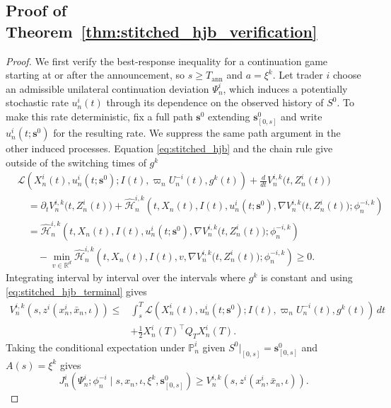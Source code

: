 \documentclass[12pt]{article}
\numberwithin{equation}{section}
\theoremstyle{definition}
\begin{document}
\subsection{Proof of Theorem~\ref{thm:stitched_hjb_verification}}
\label{subsec:proof_stitched_hjb_verification}

\begin{proof}
We first verify the best-response inequality for a continuation game starting
at or after the announcement, so \(s\geq T_{\mathrm{ann}}\) and \(a=\xi^k\).
Let trader \(i\) choose an admissible unilateral continuation deviation
\(\Psi_n^i\), which induces a potentially stochastic rate \(u_n^i(t)\) through
its dependence on the observed history of \(S^0\). To make this rate
deterministic, fix a full path \(\mathbf{s}^0\) extending \(\mathbf{s}^0_{[0,s]}\) and write
\(u_n^i(t;\mathbf{s}^0)\) for the resulting rate. We suppress the same path argument in
the other induced processes.
Equation \eqref{eq:stitched_hjb} and the chain rule
give outside of the switching times of \(g^k\)
\[
\begin{aligned}
&\mathcal L\left(
X_n^i(t),u_n^i(t;\mathbf{s}^0);
I(t),\varpi_nU_n^{-i}(t),g^k(t)
\right)
+\frac{d}{dt}V_n^{i,k}\bigl(t,Z_n^i(t)\bigr)
\\
&\quad=
\partial_tV_n^{i,k}\bigl(t,Z_n^i(t)\bigr)
+
\widehat{\mathscr H}_n^{i,k}\left(
t,X_n(t),I(t),u_n^i(t;\mathbf{s}^0),
\nabla V_n^{i,k}\bigl(t,Z_n^i(t)\bigr);
\phi_n^{-i,k}
\right)
\\
&\quad=
\widehat{\mathscr H}_n^{i,k}\left(
t,X_n(t),I(t),u_n^i(t;\mathbf{s}^0),
\nabla V_n^{i,k}\bigl(t,Z_n^i(t)\bigr);
\phi_n^{-i,k}
\right)
\\
&\qquad-
\min_{v\in\mathbb R^d}
\widehat{\mathscr H}_n^{i,k}\left(
t,X_n(t),I(t),v,
\nabla V_n^{i,k}\bigl(t,Z_n^i(t)\bigr);
\phi_n^{-i,k}
\right)
\geq 0.
\end{aligned}
\]
Integrating interval by interval over the intervals where \(g^k\) is constant
and using \eqref{eq:stitched_hjb_terminal} gives
\begin{equation}\label{eq:post_announcement_pathwise_bound}
\begin{aligned}
V_n^{i,k}\left(s,z^i(x_n^i,\bar x_n,\iota)\right)
\leq{}&
\int_s^T
\mathcal L\left(
X_n^i(t),u_n^i(t;\mathbf{s}^0);
I(t),\varpi_nU_n^{-i}(t),g^k(t)
\right)\,dt
\\
&+
\frac{1}{2}X_n^i(T)^\top Q_TX_n^i(T).
\end{aligned}
\end{equation}
Taking the conditional expectation under \(\mathbb P_n^i\) given
\(S^0|_{[0,s]}=\mathbf{s}^0_{[0,s]}\) and \(A(s)=\xi^k\) gives
\[
J_n^i\left(
\Psi_n^i;\phi_n^{-i}
\mid s,x_n,\iota,\xi^k,\mathbf{s}^0_{[0,s]}
\right)
\geq
V_n^{i,k}\left(s,z^i(x_n^i,\bar x_n,\iota)\right).
\]


\end{proof}
\end{document}
